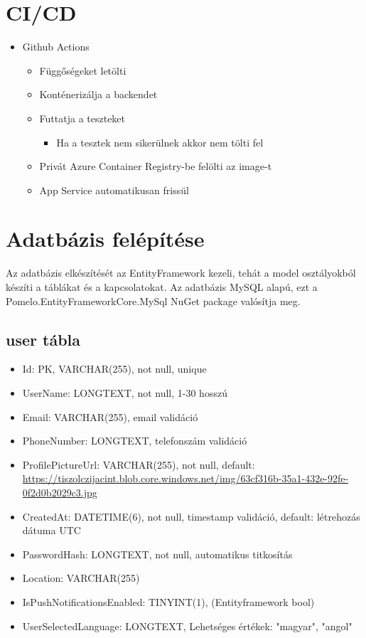 \documentclass[11pt]{article}
\begin{document}
\section{CI/CD}
\label{sec:orga505b8c}
\begin{itemize}
\item Github Actions
\begin{itemize}
\item Függőségeket letölti
\item Konténerizálja a backendet
\item Futtatja a teszteket
\begin{itemize}
\item Ha a tesztek nem sikerülnek akkor nem tölti fel
\end{itemize}
\item Privát Azure Container Registry-be felölti az image-t
\item App Service automatikusan frissül
\end{itemize}
\end{itemize}
\section{Adatbázis felépítése}
\label{sec:org0903adb}

Az adatbázis elkészítését az EntityFramework kezeli, tehát a model osztályokból készíti a táblákat és a kapcsolatokat. Az adatbázis MySQL alapú, ezt a Pomelo.EntityFrameworkCore.MySql NuGet package valósítja meg.
\subsection{user tábla}
\label{sec:org6de48fd}
\begin{itemize}
\item Id: PK, VARCHAR(255), not null, unique
\item UserName: LONGTEXT, not null, 1-30 hosszú
\item Email: VARCHAR(255), email validáció
\item PhoneNumber: LONGTEXT, telefonszám validáció
\item ProfilePictureUrl: VARCHAR(255), not null, default: \url{https://tiszolczijacint.blob.core.windows.net/img/63cf316b-35a1-432e-92fe-0f2d0b2029c3.jpg}
\item CreatedAt: DATETIME(6), not null, timestamp validáció, default: létrehozás dátuma UTC
\item PasswordHash: LONGTEXT, not null, automatikus titkosítás
\item Location: VARCHAR(255)
\item IsPushNotificationsEnabled: TINYINT(1), (Entityframework bool)
\item UserSelectedLanguage: LONGTEXT, Lehetséges értékek: "magyar", "angol"
\end{itemize}
\end{document}

